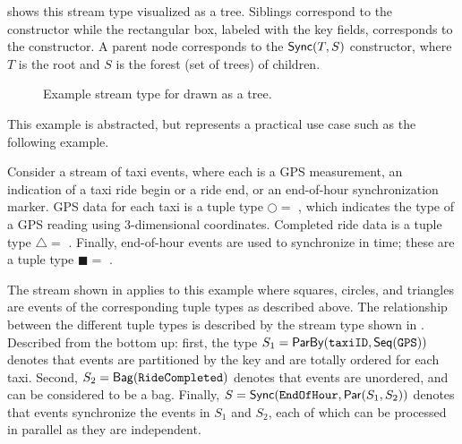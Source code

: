  shows this stream type visualized as a tree.
Siblings correspond to the  constructor while the rectangular box,
labeled with the key fields, corresponds to the  constructor.
A parent node corresponds to the $\mathsf{Sync}({T}, S)$ constructor, where $T$ is the root and $S$ is the forest (set of trees) of children.

\begin{figure}[t]
  \centering
  \caption{Example stream type for  drawn as a tree.}
  \label{45:fig:example-schema}
\end{figure}

This example is abstracted, but represents a practical use case such as the following example.

\begin{example}
\label{45:ex:taxi-distance-schema-headers}
\label{45:ex:taxi-distance-schema}
Consider a stream of taxi events, where each is a GPS measurement, an indication of a taxi ride begin or a ride end, or an end-of-hour synchronization marker.
GPS data for each taxi is a tuple type $\bigcirc =$ , which indicates the type of a GPS reading using 3-dimensional coordinates.
Completed ride data is a tuple type $\triangle =$ .
Finally, end-of-hour events are used to synchronize in time; these are a tuple type $\blacksquare =$ .

The stream shown in  applies to this example where squares, circles, and triangles are events of the corresponding tuple types as described above.
The relationship between the different tuple types is described by the stream type shown in .
Described from the bottom up: first, the type $S_1 = \mathsf{ParBy}({\texttt{taxiID}}, \mathsf{Seq}({\texttt{GPS}}))$ denotes that  events are partitioned by the key  and are totally ordered for each taxi.
Second, $S_2 = \mathsf{Bag}({\texttt{RideCompleted}})$ denotes that  events are unordered, and can be considered to be a bag.
Finally, $S = \mathsf{Sync}({\texttt{EndOfHour}}, \mathsf{Par}({S_1}, {S_2}))$ denotes that  events synchronize the events in $S_1$ and $S_2$, each of which can be processed in parallel as they are independent.
\end{example}

